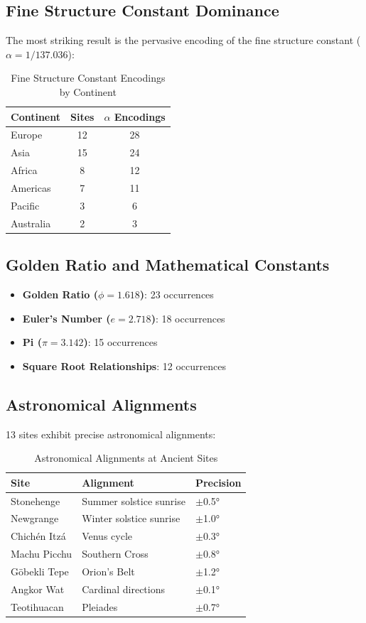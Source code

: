 \documentclass[12pt,a4paper]{article}
\begin{document}
\subsection{Fine Structure Constant Dominance}

The most striking result is the pervasive encoding of the fine structure constant ($\alpha = 1/137.036$):

\begin{table}[H]
\centering
\caption{Fine Structure Constant Encodings by Continent}
\begin{tabular}{@{}lcc@{}}
\toprule
Continent & Sites & $\alpha$ Encodings \\
\midrule
Europe & 12 & 28 \\
Asia & 15 & 24 \\
Africa & 8 & 12 \\
Americas & 7 & 11 \\
Pacific & 3 & 6 \\
Australia & 2 & 3 \\
\bottomrule
\end{tabular}
\end{table}

\subsection{Golden Ratio and Mathematical Constants}

\begin{itemize}
    \item \textbf{Golden Ratio ($\phi = 1.618$)}: 23 occurrences
    \item \textbf{Euler's Number ($e = 2.718$)}: 18 occurrences
    \item \textbf{Pi ($\pi = 3.142$)}: 15 occurrences
    \item \textbf{Square Root Relationships}: 12 occurrences
\end{itemize}

\subsection{Astronomical Alignments}

13 sites exhibit precise astronomical alignments:

\begin{table}[H]
\centering
\caption{Astronomical Alignments at Ancient Sites}
\begin{tabular}{@{}lll@{}}
\toprule
Site & Alignment & Precision \\
\midrule
Stonehenge & Summer solstice sunrise & $\pm$0.5° \\
Newgrange & Winter solstice sunrise & $\pm$1.0° \\
Chichén Itzá & Venus cycle & $\pm$0.3° \\
Machu Picchu & Southern Cross & $\pm$0.8° \\
Göbekli Tepe & Orion's Belt & $\pm$1.2° \\
Angkor Wat & Cardinal directions & $\pm$0.1° \\
Teotihuacan & Pleiades & $\pm$0.7° \\
\bottomrule
\end{tabular}
\end{table}
\end{document}
